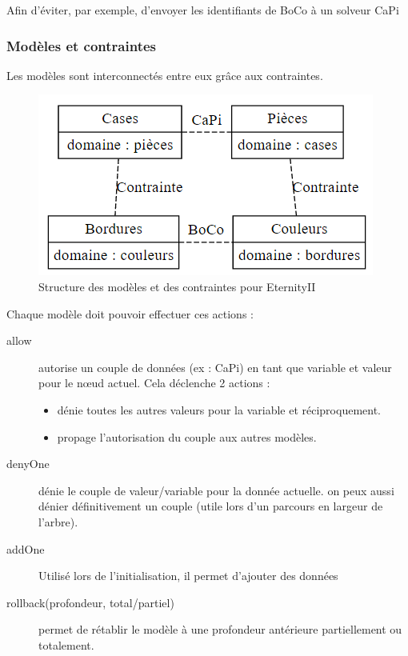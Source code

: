 \begin{exmp}
	Afin d'éviter, par exemple, d'envoyer les identifiants de BoCo à un solveur CaPi
\end{exmp}

\subsubsection{Modèles et contraintes}

Les modèles sont interconnectés entre eux grâce aux contraintes.

\begin{figure}[H]
	\includegraphics[width=\linewidth]{images/modeles_contraintes}
	\caption{Structure des modèles et des contraintes pour EternityII}
	\label{fig:modeles_contraintes}
\end{figure}

Chaque modèle doit pouvoir effectuer ces actions :

\begin{description}
	\item[allow] autorise un couple de données (ex : CaPi) en tant que variable et valeur pour le n\oe ud actuel. Cela déclenche 2 actions : 
	\begin{itemize}
		\item dénie toutes les autres valeurs pour la variable et réciproquement.
		\item propage l'autorisation du couple aux autres modèles.
	\end{itemize}
	\item[denyOne] dénie le couple de valeur/variable pour la donnée actuelle. on peux aussi dénier définitivement un couple (utile lors d'un parcours en largeur de l'arbre).
	\item[addOne] Utilisé lors de l'initialisation, il permet d'ajouter des données
	\item[rollback(profondeur, total/partiel)] permet de rétablir le modèle à une profondeur antérieure partiellement ou totalement.
\end{description}
\newpage

